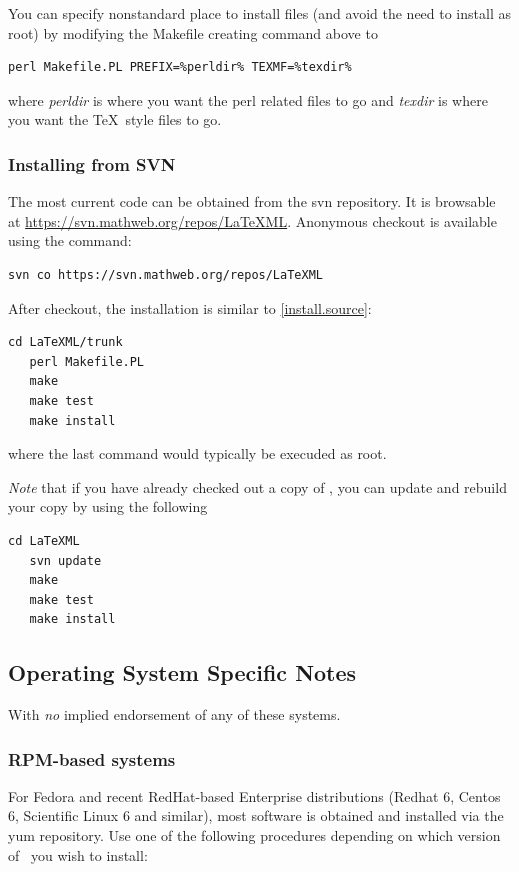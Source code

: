 \documentclass{article}
\begin{document}
You can specify nonstandard place to install files (and avoid the need to install as root)
by modifying the Makefile creating command above to
\begin{lstlisting}[style=shell]
   perl Makefile.PL PREFIX=%perldir% TEXMF=%texdir%
\end{lstlisting}
where \emph{perldir} is where you want the perl related files to go and
\emph{texdir} is where you want the \TeX\ style files to go.

\subsubsection{Installing from SVN}\label{install.svn}
The most current code can be obtained from the svn repository.
It is browsable at \url{https://svn.mathweb.org/repos/LaTeXML}.
Anonymous checkout is available using the command:
\begin{lstlisting}[style=shell]
  svn co https://svn.mathweb.org/repos/LaTeXML
\end{lstlisting}
After checkout, the installation is similar to \ref{install.source}:
\begin{lstlisting}[style=shell]
   cd LaTeXML/trunk
   perl Makefile.PL
   make
   make test
   make install
\end{lstlisting}
where the last command would typically be execuded as root.

\emph{Note} that if you have already checked out a copy of \LaTeXML, you can update
and rebuild your copy by using the following
\begin{lstlisting}[style=shell]
   cd LaTeXML
   svn update
   make
   make test
   make install
\end{lstlisting}

\subsection[OS-Specific Notes]{Operating System Specific Notes}\label{install.osnotes}
With \emph{no} implied endorsement of any of these systems.

\subsubsection[RPM-based systems]{RPM-based systems}\label{install.fedora}
For Fedora and recent RedHat-based Enterprise distributions
(Redhat 6, Centos 6, Scientific Linux 6 and similar),
most software is obtained and installed via the yum repository.
Use one of the following procedures depending on which version
of \LaTeXML\ you wish to install:
\end{document}
